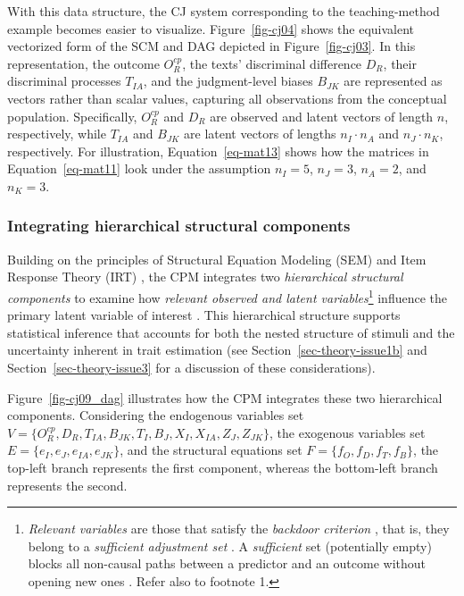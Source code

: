 \documentclass[
  authoryear,
  review,
  1p]{elsarticle}
\begin{document}
With this data structure, the CJ system corresponding to the
teaching-method example becomes easier to visualize.
Figure~\ref{fig-cj04} shows the equivalent vectorized form of the SCM
and DAG depicted in Figure~\ref{fig-cj03}. In this representation, the
outcome \(O^{cp}_{R}\), the texts' discriminal difference \(D_{R}\),
their discriminal processes \(T_{IA}\), and the judgment-level biases
\(B_{JK}\) are represented as vectors rather than scalar values,
capturing all observations from the conceptual population. Specifically,
\(O^{cp}_{R}\) and \(D_{R}\) are observed and latent vectors of length
\(n\), respectively, while \(T_{IA}\) and \(B_{JK}\) are latent vectors
of lengths \(n_{I} \cdot n_{A}\) and \(n_{J} \cdot n_{K}\),
respectively. For illustration, Equation~\ref{eq-mat13} shows how the
matrices in Equation~\ref{eq-mat11} look under the assumption
\(n_{I} = 5\), \(n_{J} = 3\), \(n_{A} = 2\), and \(n_{K} = 3\).

\subsubsection{Integrating hierarchical structural
components}\label{sec-theory-theoretical_P3}

Building on the principles of Structural Equation Modeling (SEM)
\citep{Hoyle_et_al_2023} and Item Response Theory (IRT)
\citep{Fox_2010, vanderLinden_et_al_2017_I}, the CPM integrates two
\emph{hierarchical structural components} to examine how \emph{relevant
observed and latent variables}\footnote{\emph{Relevant variables} are
  those that satisfy the \emph{backdoor criterion} \citep[pp
  37]{Neal_2020}, that is, they belong to a \emph{sufficient adjustment
  set} \citep{Pearl_2009, Pearl_et_al_2016, Morgan_et_al_2014}. A
  \emph{sufficient} set (potentially empty) blocks all non-causal paths
  between a predictor and an outcome without opening new ones
  \citep{Pearl_2009}. Refer also to footnote 1.} influence the primary
latent variable of interest \citep{Everitt_et_al_2010}. This
hierarchical structure supports statistical inference that accounts for
both the nested structure of stimuli and the uncertainty inherent in
trait estimation (see Section~\ref{sec-theory-issue1b} and
Section~\ref{sec-theory-issue3} for a discussion of these
considerations).

Figure~\ref{fig-cj09_dag} illustrates how the CPM integrates these two
hierarchical components. Considering the endogenous variables set
\(V = \{ O_{R}^{cp}, D_{R}, T_{IA}, B_{JK}, T_{I}, B_{J}, X_{I}, X_{IA}, Z_{J}, Z_{JK} \}\),
the exogenous variables set \(E = \{ e_{I}, e_{J}, e_{IA}, e_{JK} \}\),
and the structural equations set
\(F = \{ f_{O}, f_{D}, f_{T}, f_{B} \}\), the top-left branch represents
the first component, whereas the bottom-left branch represents the
second.
\end{document}
